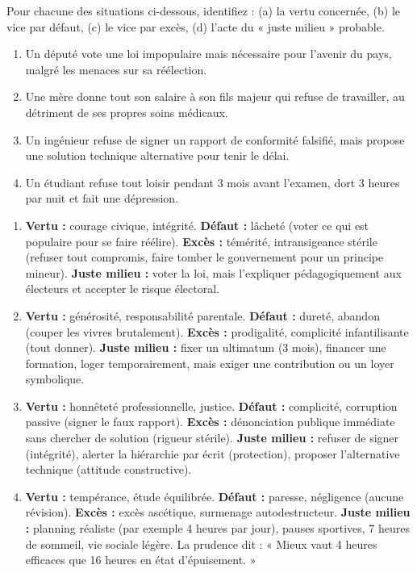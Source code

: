 \documentclass[11pt]{article}
\begin{document}
\begin{exercice}
Pour chacune des situations ci-dessous, identifiez : (a) la vertu concernée, (b) le vice par défaut, (c) le vice par excès, (d) l'acte du « juste milieu » probable.
\begin{enumerate}
    \item Un député vote une loi impopulaire mais nécessaire pour l'avenir du pays, malgré les menaces sur sa réélection.
    \item Une mère donne tout son salaire à son fils majeur qui refuse de travailler, au détriment de ses propres soins médicaux.
    \item Un ingénieur refuse de signer un rapport de conformité falsifié, mais propose une solution technique alternative pour tenir le délai.
    \item Un étudiant refuse tout loisir pendant 3 mois avant l'examen, dort 3 heures par nuit et fait une dépression.
\end{enumerate}
\end{exercice}

\begin{corrige}[Exercice n°1]
\begin{enumerate}
    \item \textbf{Vertu :} courage civique, intégrité. \textbf{Défaut :} lâcheté (voter ce qui est populaire pour se faire réélire). \textbf{Excès :} témérité, intransigeance stérile (refuser tout compromis, faire tomber le gouvernement pour un principe mineur). \textbf{Juste milieu :} voter la loi, mais l'expliquer pédagogiquement aux électeurs et accepter le risque électoral.
    \item \textbf{Vertu :} générosité, responsabilité parentale. \textbf{Défaut :} dureté, abandon (couper les vivres brutalement). \textbf{Excès :} prodigalité, complicité infantilisante (tout donner). \textbf{Juste milieu :} fixer un ultimatum (3 mois), financer une formation, loger temporairement, mais exiger une contribution ou un loyer symbolique.
    \item \textbf{Vertu :} honnêteté professionnelle, justice. \textbf{Défaut :} complicité, corruption passive (signer le faux rapport). \textbf{Excès :} dénonciation publique immédiate sans chercher de solution (rigueur stérile). \textbf{Juste milieu :} refuser de signer (intégrité), alerter la hiérarchie par écrit (protection), proposer l'alternative technique (attitude constructive).
    \item \textbf{Vertu :} tempérance, étude équilibrée. \textbf{Défaut :} paresse, négligence (aucune révision). \textbf{Excès :} excès ascétique, surmenage autodestructeur. \textbf{Juste milieu :} planning réaliste (par exemple 4 heures par jour), pauses sportives, 7 heures de sommeil, vie sociale légère. La prudence dit : « Mieux vaut 4 heures efficaces que 16 heures en état d'épuisement. »
\end{enumerate}
\end{corrige}
\end{document}
